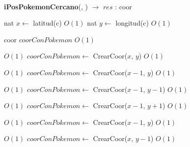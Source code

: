 \begin{Algoritmos}
\begin{algorithmic}[1]
\end{algorithmic}

$ $\newline
$ $\newline
$ $\newline



{\textbf{iPosPokemonCercano}(, ) $\to$ $res$ : coor}
\begin{algorithmic}[1]

\State nat $x \gets$ latitud(c)    \Comment $O(1)$
\State nat $y \gets$ longitud(c)   \Comment $O(1)$


\State coor $coorConPokemon$    \Comment $O(1)$

     \Comment $O(1)$
    \State $coorConPokemon \gets$ CrearCoor($x$, $y$)    \Comment $O(1)$
\EndIf

         \Comment $O(1)$
        \State $coorConPokemon \gets$ CrearCoor($x-1$, $y$)    \Comment $O(1)$
    \EndIf


             \Comment $O(1)$
            \State $coorConPokemon \gets$ CrearCoor($x-1$, $y-1$)    \Comment $O(1)$
        \EndIf

    \EndIf

             \Comment $O(1)$
            \State $coorConPokemon \gets$ CrearCoor($x-1$, $y+1$)    \Comment $O(1)$
        \EndIf
    \EndIf

             \Comment $O(1)$
            \State $coorConPokemon \gets$ CrearCoor($x-1$, $y$)    \Comment $O(1)$
        \EndIf
    \EndIf

\EndIf


         \Comment $O(1)$
        \State $coorConPokemon \gets$ CrearCoor($x$, $y-1$)    \Comment $O(1)$
    \EndIf



\end{algorithmic}
\end{Algoritmos}
